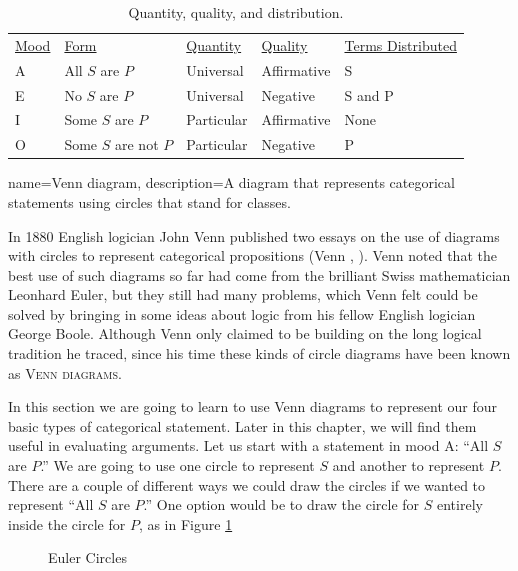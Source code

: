 \begin{table}[b]
\begin{mdframed}[style=mytablebox]
\begin{tabu}{p{.1\linewidth}p{.2\linewidth}p{.15\linewidth}p{.15\linewidth}p{.4\linewidth}}
 \underline{Mood} & \underline{Form} &  \underline{Quantity} & \underline{Quality} & \underline{Terms Distributed} \\ 
A & All $S$ are $P$ & Universal &  Affirmative & S\\
E & No $S$ are $P$ & Universal & Negative & S and P\\
I & Some $S$ are $P$ & Particular & Affirmative & None\\
O &Some $S$ are not $P$ & Particular &Negative & P \\
\end{tabu}
\end{mdframed}
\caption{Quantity, quality, and distribution.}\label{tab:quantity}
\end{table}

{
name=Venn diagram,
description={A diagram that represents categorical statements using circles that stand for classes.}
}


In 1880 English logician John Venn published two essays on the use of diagrams with circles to represent categorical propositions (Venn \citeyear{Venn1880a}, \citeyear{Venn1880b}). Venn noted that the best use of such diagrams so far had come from the brilliant Swiss mathematician Leonhard Euler, but they still had many problems, which Venn felt could be solved by bringing in some ideas about logic from his fellow English logician George Boole. Although Venn only claimed to be building on the long logical tradition he traced, since his time these kinds of circle diagrams have been known as \textsc{\glspl{Venn diagram}}.

In this section we are going to learn to use Venn diagrams to represent our four basic types of categorical statement. Later in this chapter, we will find them useful in evaluating arguments. Let us start with a statement in mood A: ``All $S$ are $P$.'' We are going to use one circle to represent $S$ and another to represent $P$. There are a couple of different ways we could draw the circles if we wanted to represent ``All $S$ are $P$.'' One option would be to draw the circle for $S$ entirely inside the circle for $P$, as in Figure \ref{fig:euler_circles}

\begin{figure}
\begin{mdframed}[style=mytablehalfbox]
\begin{center}
\end{center}
\end{mdframed}
\caption{Euler Circles} \label{fig:euler_circles}
\end{figure}


